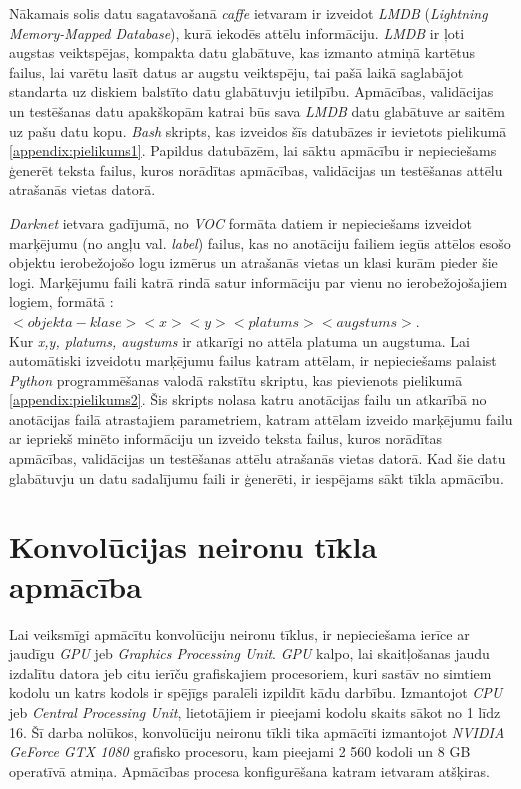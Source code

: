 Nākamais solis datu sagatavošanā \textit{caffe} ietvaram ir izveidot \textit{LMDB} (\textit{Lightning Memory-Mapped Database}), kurā iekodēs attēlu informāciju. \textit{LMDB} ir ļoti augstas veiktspējas, kompakta datu glabātuve, kas izmanto atmiņā kartētus failus, lai varētu lasīt datus ar augstu veiktspēju, tai pašā laikā saglabājot standarta uz diskiem balstīto datu glabātuvju ietilpību. Apmācības, validācijas un testēšanas datu apakškopām katrai būs sava \textit{LMDB} datu glabātuve ar saitēm uz pašu datu kopu. \textit{Bash} skripts, kas izveidos šīs datubāzes ir ievietots pielikumā \ref{appendix:pielikums1}. Papildus datubāzēm, lai sāktu apmācību ir nepieciešams ģenerēt teksta failus, kuros norādītas apmācības, validācijas un testēšanas attēlu atrašanās vietas datorā.

\textit{Darknet} ietvara gadījumā, no \textit{VOC} formāta datiem ir nepieciešams izveidot marķējumu (no angļu val. \textit{label}) failus, kas no anotāciju failiem iegūs attēlos esošo objektu ierobežojošo logu izmērus un atrašanās vietas un klasi kurām pieder šie logi. Marķējumu faili katrā rindā satur informāciju par vienu no ierobežojošajiem logiem, formātā :\\ $<objekta-klase> <x> <y> <platums> <augstums>$.\\
Kur \textit{x,y, platums, augstums} ir atkarīgi no attēla platuma un augstuma. Lai automātiski izveidotu marķējumu failus katram attēlam, ir nepieciešams palaist \textit{Python} programmēšanas valodā rakstītu skriptu, kas pievienots pielikumā \ref{appendix:pielikums2}. Šis skripts nolasa katru anotācijas failu un atkarībā no anotācijas failā atrastajiem parametriem, katram attēlam izveido marķējumu failu ar iepriekš minēto informāciju un izveido teksta failus, kuros norādītas apmācības, validācijas un testēšanas attēlu atrašanās vietas datorā. Kad šie datu glabātuvju un datu sadalījumu faili ir ģenerēti, ir iespējams sākt tīkla apmācību.
\section{Konvolūcijas neironu tīkla apmācība}
Lai veiksmīgi apmācītu konvolūciju neironu tīklus, ir nepieciešama ierīce ar jaudīgu \textit{GPU} jeb \textit{Graphics Processing Unit}. \textit{GPU} kalpo, lai skaitļošanas jaudu izdalītu datora jeb citu ierīču grafiskajiem procesoriem, kuri sastāv no simtiem kodolu un katrs kodols ir spējīgs paralēli izpildīt kādu darbību. Izmantojot \textit{CPU} jeb \textit{Central Processing Unit}, lietotājiem ir pieejami kodolu skaits sākot no 1 līdz 16. Šī darba nolūkos, konvolūciju neironu tīkli tika apmācīti izmantojot \textit{NVIDIA GeForce GTX 1080} grafisko procesoru, kam pieejami 2 560 kodoli un 8 GB operatīvā atmiņa. Apmācības procesa konfigurēšana katram ietvaram atšķiras.

